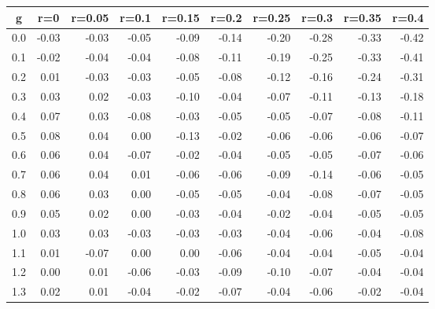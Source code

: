 %
\begin{table}[!tbp]
 \begin{center}
 \begin{tabular}{rrrrrrrrrr}\hline\hline
\multicolumn{1}{c}{g}&\multicolumn{1}{c}{r=0}&\multicolumn{1}{c}{r=0.05}&\multicolumn{1}{c}{r=0.1}&\multicolumn{1}{c}{r=0.15}&\multicolumn{1}{c}{r=0.2}&\multicolumn{1}{c}{r=0.25}&\multicolumn{1}{c}{r=0.3}&\multicolumn{1}{c}{r=0.35}&\multicolumn{1}{c}{r=0.4}\tabularnewline
\hline
0.0&-0.03&-0.03&-0.05&-0.09&-0.14&-0.20&-0.28&-0.33&-0.42\tabularnewline
0.1&-0.02&-0.04&-0.04&-0.08&-0.11&-0.19&-0.25&-0.33&-0.41\tabularnewline
0.2& 0.01&-0.03&-0.03&-0.05&-0.08&-0.12&-0.16&-0.24&-0.31\tabularnewline
0.3& 0.03& 0.02&-0.03&-0.10&-0.04&-0.07&-0.11&-0.13&-0.18\tabularnewline
0.4& 0.07& 0.03&-0.08&-0.03&-0.05&-0.05&-0.07&-0.08&-0.11\tabularnewline
0.5& 0.08& 0.04& 0.00&-0.13&-0.02&-0.06&-0.06&-0.06&-0.07\tabularnewline
0.6& 0.06& 0.04&-0.07&-0.02&-0.04&-0.05&-0.05&-0.07&-0.06\tabularnewline
0.7& 0.06& 0.04& 0.01&-0.06&-0.06&-0.09&-0.14&-0.06&-0.05\tabularnewline
0.8& 0.06& 0.03& 0.00&-0.05&-0.05&-0.04&-0.08&-0.07&-0.05\tabularnewline
0.9& 0.05& 0.02& 0.00&-0.03&-0.04&-0.02&-0.04&-0.05&-0.05\tabularnewline
1.0& 0.03& 0.03&-0.03&-0.03&-0.03&-0.04&-0.06&-0.04&-0.08\tabularnewline
1.1& 0.01&-0.07& 0.00& 0.00&-0.06&-0.04&-0.04&-0.05&-0.04\tabularnewline
1.2& 0.00& 0.01&-0.06&-0.03&-0.09&-0.10&-0.07&-0.04&-0.04\tabularnewline
1.3& 0.02& 0.01&-0.04&-0.02&-0.07&-0.04&-0.06&-0.02&-0.04\tabularnewline
\hline
\end{tabular}

\end{center}

\end{table}

